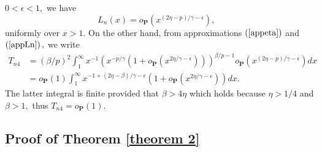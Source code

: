 \documentclass[reqno,openbib,runningheads,a4paper,12pt]{amsart}%
\begin{document}
$0<\epsilon<1,$ we have%
\begin{equation}
L_{n}\left(  x\right)  =o_{\mathbf{P}}\left(  x^{\left(  2\eta-p\right)
/\gamma-\epsilon}\right)  ,\text{ } \label{appLn}%
\end{equation}
uniformly over $x>1.$ On the other hand, from approximations $\left(
\ref{appeta}\right)  $ and $\left(  \ref{appLn}\right)  ,$ we write
\begin{align*}
T_{n4}  &  =\left(  \beta/p\right)  ^{2}\int_{1}^{\infty}x^{-1}\left(
x^{-p/\gamma}\left(  1+o_{\mathbf{P}}\left(  x^{2\eta/\gamma-\epsilon}\right)
\right)  \right)  ^{\beta/p-1}o_{\mathbf{P}}\left(  x^{\left(  2\eta-p\right)
/\gamma-\epsilon}\right)  dx\\
&  =o_{\mathbf{P}}\left(  1\right)  \int_{1}^{\infty}x^{-1+\left(  2\eta
-\beta\right)  /\gamma-\epsilon}\left(  1+o_{\mathbf{P}}\left(  x^{2\eta
/\gamma-\epsilon}\right)  \right)  dx.
\end{align*}
The latter integral is finite provided that $\beta>4\eta$ which holds because
$\eta>1/4$ and $\beta>1,$ thus $T_{n4}=o_{\mathbf{P}}\left(  1\right)  .$

\subsection{\textbf{Proof }of Theorem \ref{theorem 2}}
\end{document}
